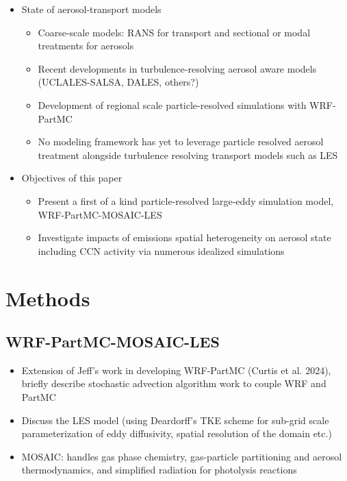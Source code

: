 \documentclass[journal abbreviation, manuscript]{copernicus}
\begin{document}
\begin{itemize}
\item State of aerosol-transport models
\begin{itemize}
\item Coarse-scale models: RANS for transport and sectional or modal treatments for aerosols
\item Recent developments in turbulence-resolving aerosol aware models (UCLALES-SALSA, DALES, others?)
\item Development of regional scale particle-resolved simulations with WRF-PartMC
\item No modeling framework has yet to leverage particle resolved aerosol treatment alongside turbulence resolving transport models such as LES
\end{itemize}

\item Objectives of this paper
\begin{itemize}
\item Present a first of a kind particle-resolved large-eddy simulation model, WRF-PartMC-MOSAIC-LES
\item Investigate impacts of emissions spatial heterogeneity on aerosol state including CCN activity via numerous idealized simulations
\end{itemize}

\end{itemize}



\section{Methods}

\subsection{WRF-PartMC-MOSAIC-LES}
\begin{itemize}
\item Extension of Jeff's work in developing WRF-PartMC (Curtis et al. 2024), briefly describe stochastic advection algorithm work to couple WRF and PartMC
\item Discuss the LES model (using Deardorff's TKE scheme for sub-grid scale parameterization of eddy diffusivity, spatial resolution of the domain etc.)
\item MOSAIC: handles gas phase chemistry, gas-particle partitioning and aerosol thermodynamics, and simplified radiation for photolysis reactions 
\end{itemize}
\end{document}

